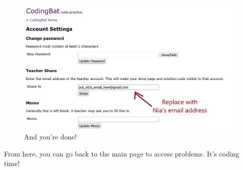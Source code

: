\documentclass[12pt]{scrartcl}
\begin{document}
\begin{figure}[H]
    \centering
    \includegraphics[scale=0.55]{TeacherShare.png}
    \caption*{And you're done!}
\end{figure}

From here, you can go back to the main page to access problems. It's coding time!
\end{document}
